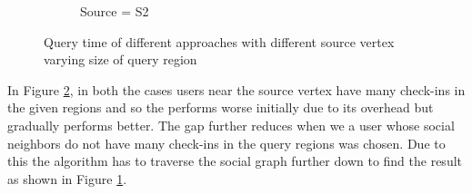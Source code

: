 \begin{figure}[t]
\begin{subfigure}[t]{0.23\textwidth}
		\caption{Source = S2}
		\label{fig:plot-11}
	\end{subfigure}
	\caption{Query time of different {\rrp} approaches with different source vertex varying size of query region}
	\label{fig:plot1011}
\end{figure}

In Figure \ref{fig:plot1011}, in both the cases users near the source vertex have many check-ins in the given regions and so the {\rrpspatial} performs worse initially due to its overhead but gradually performs better. The gap further reduces when we a user whose social neighbors do not have many check-ins in the query regions was chosen. Due to this the algorithm has to traverse the social graph further down to find the result as shown in Figure \ref{fig:plot-11}.
